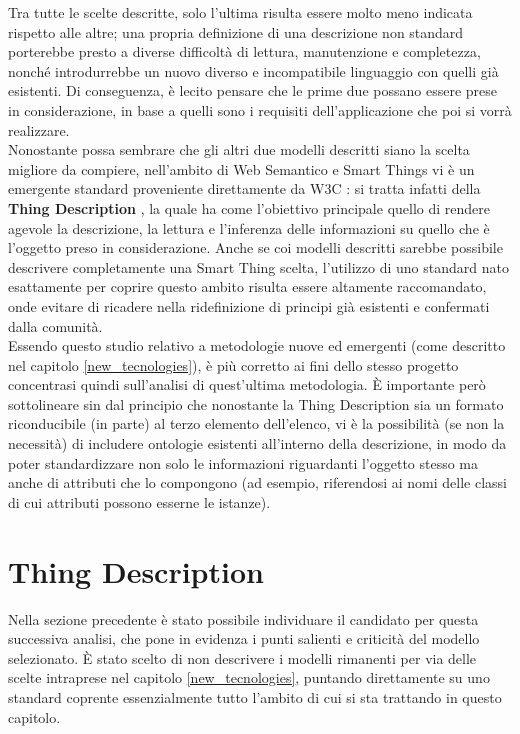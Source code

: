\documentclass[12pt,a4paper,openright,oneside]{report}
\begin{document}
Tra tutte le scelte descritte, solo l'ultima risulta essere molto meno indicata rispetto alle altre; una propria definizione di una descrizione non standard porterebbe presto a diverse difficoltà di lettura, manutenzione e completezza, nonché introdurrebbe un nuovo diverso e incompatibile linguaggio con quelli già esistenti. Di conseguenza, è lecito pensare che le prime due possano essere prese in considerazione, in base a quelli sono i requisiti dell'applicazione che poi si vorrà realizzare.\\

Nonostante possa sembrare che gli altri due modelli descritti siano la scelta migliore da compiere, nell'ambito di Web Semantico e Smart Things vi è un emergente standard proveniente direttamente da W3C \cite{w3c}: si tratta infatti della \textbf{Thing Description} \cite{td}, la quale ha come l'obiettivo principale quello di rendere agevole la descrizione, la lettura e l'inferenza delle informazioni su quello che è l'oggetto preso in considerazione. Anche se coi modelli descritti sarebbe possibile descrivere completamente una Smart Thing scelta, l'utilizzo di uno standard nato esattamente per coprire questo ambito risulta essere altamente raccomandato, onde evitare di ricadere nella ridefinizione di principi già esistenti e confermati dalla comunità.\\

Essendo questo studio relativo a metodologie nuove ed emergenti (come descritto nel capitolo \ref{new_tecnologies}), è più corretto ai fini dello stesso progetto concentrasi quindi sull'analisi di quest'ultima metodologia. È importante però sottolineare sin dal principio che nonostante la Thing Description sia un formato riconducibile (in parte) al terzo elemento dell'elenco, vi è la possibilità (se non la necessità) di includere ontologie esistenti all'interno della descrizione, in modo da poter standardizzare non solo le informazioni riguardanti l'oggetto stesso ma anche di attributi che lo compongono (ad esempio, riferendosi ai nomi delle classi di cui attributi possono esserne le istanze).\\

\section{Thing Description}
\label{sec:thing_description}
Nella sezione precedente è stato possibile individuare il candidato per questa successiva analisi, che pone in evidenza i punti salienti e criticità del modello selezionato. È stato scelto di non descrivere i modelli rimanenti per via delle scelte intraprese nel capitolo \ref{new_tecnologies}, puntando direttamente su uno standard coprente essenzialmente tutto l'ambito di cui si sta trattando in questo capitolo.\\
\end{document}
